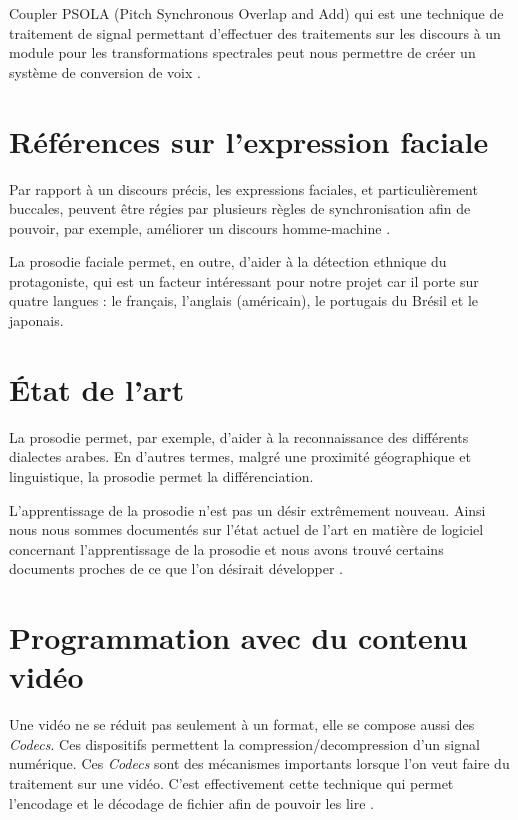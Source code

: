 Coupler PSOLA (Pitch Synchronous Overlap and Add) qui est une technique de traitement de signal permettant d'effectuer des traitements sur les discours à un module pour les transformations spectrales peut nous permettre de créer un système de conversion de voix \cite{valbret1992voice}.

\section{Références sur l'expression faciale}\label{ref_transfo_faciales}

Par rapport à un discours précis, les expressions faciales, et particulièrement buccales, peuvent être régies par plusieurs règles de synchronisation afin de pouvoir, par exemple, améliorer un discours homme-machine \cite{beskow1995rule} .

La prosodie faciale permet, en outre, d'aider à la détection ethnique du protagoniste, qui est un facteur intéressant pour notre projet car il porte sur quatre langues : le français, l'anglais (américain), le portugais du Brésil et le japonais\cite{matsumoto1992american}.


\section{État de l'art}\label{state_of_the_art}

La prosodie permet, par exemple, d'aider à la reconnaissance des différents dialectes arabes. En d'autres termes, malgré une proximité géographique et linguistique, la prosodie permet la différenciation\cite{rouas2006identification}.

L'apprentissage de la prosodie n'est pas un désir extrêmement nouveau. Ainsi nous nous sommes documentés sur l'état actuel de l'art en matière de logiciel concernant l'apprentissage de la prosodie et nous avons trouvé certains documents proches de ce que l'on désirait développer \cite{10.4000/alsic.332}. 

\section{Programmation avec du contenu vidéo}

Une vidéo ne se réduit pas seulement à un format, elle se compose aussi des \textit{Codecs}. Ces dispositifs permettent la compression/decompression d'un signal numérique. Ces \textit{Codecs} sont des mécanismes importants lorsque l'on veut faire du traitement sur une vidéo. C'est effectivement cette technique qui permet l'encodage et le décodage de fichier afin de pouvoir les lire \cite{ghanbari1999video} \cite{he2013introduction}.
